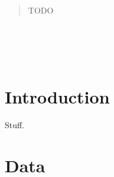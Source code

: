 

\begin{abstract}\noindent
TODO
\end{abstract}


\section*{~}\clearpage
\section{Introduction} \label{sec:intro}

Stuff.


\section{Data} \label{sec:data}




